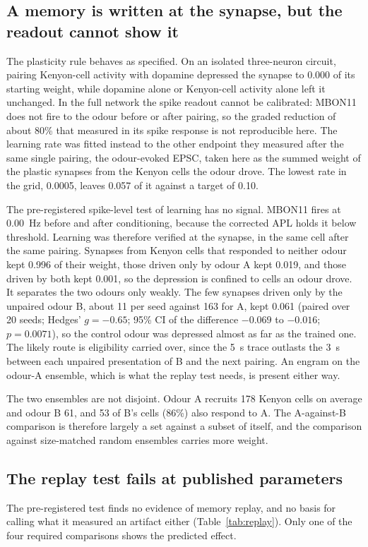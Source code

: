 \documentclass[11pt]{article}
\begin{document}
\subsection{A memory is written at the synapse, but the readout cannot show it}\label{sec:memory}
The plasticity rule behaves as specified. On an isolated three-neuron circuit, pairing Kenyon-cell activity with dopamine depressed the synapse to 0.000 of its starting weight, while dopamine alone or Kenyon-cell activity alone left it unchanged. In the full network the spike readout cannot be calibrated: MBON11 does not fire to the odour before or after pairing, so the graded reduction of about 80\% that \citet{hige2015} measured in its spike response is not reproducible here. The learning rate was fitted instead to the other endpoint they measured after the same single pairing, the odour-evoked EPSC, taken here as the summed weight of the plastic synapses from the Kenyon cells the odour drove. The lowest rate in the grid, 0.0005, leaves 0.057 of it against a target of 0.10.

The pre-registered spike-level test of learning has no signal. MBON11 fires at 0.00~Hz before and after conditioning, because the corrected APL holds it below threshold. Learning was therefore verified at the synapse, in the same cell after the same pairing. Synapses from Kenyon cells that responded to neither odour kept 0.996 of their weight, those driven only by odour A kept 0.019, and those driven by both kept 0.001, so the depression is confined to cells an odour drove. It separates the two odours only weakly. The few synapses driven only by the unpaired odour B, about 11 per seed against 163 for A, kept 0.061 (paired over 20 seeds; Hedges' $g = -0.65$; 95\% CI of the difference $-0.069$ to $-0.016$; $p = 0.0071$), so the control odour was depressed almost as far as the trained one. The likely route is eligibility carried over, since the 5~s trace outlasts the 3~s between each unpaired presentation of B and the next pairing. An engram on the odour-A ensemble, which is what the replay test needs, is present either way.

The two ensembles are not disjoint. Odour A recruits 178 Kenyon cells on average and odour B 61, and 53 of B's cells (86\%) also respond to A. The A-against-B comparison is therefore largely a set against a subset of itself, and the comparison against size-matched random ensembles carries more weight.

\subsection{The replay test fails at published parameters}
The pre-registered test finds no evidence of memory replay, and no basis for calling what it measured an artifact either (Table~\ref{tab:replay}). Only one of the four required comparisons shows the predicted effect.
\end{document}
